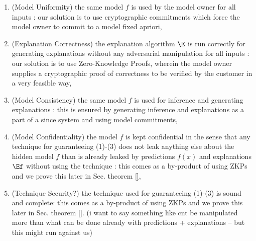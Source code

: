 \begin{enumerate}
    \item (Model Uniformity) the same model $f$ is used by the model owner for all inputs  : our solution is to use cryptographic commitments which force the model owner to commit to a model fixed apriori,
    \item (Explanation Correctness) the explanation algorithm $\E$ is run correctly for generating explanations without any adversarial manipulation for all inputs : our solution is to use Zero-Knowledge Proofs, wherein the model owner supplies a cryptographic proof of correctness to be verified by the customer in a very feasible way,
    \item (Model Consistency) the same model $f$ is used for inference and generating explanations : this is ensured by generating inference and explanations as a part of a since system and using model commitments,
    \item (Model Confidentiality) the model $f$ is kept confidential in the sense that any technique for guaranteeing (1)-(3) does not leak anything else about the hidden model $f$ than is already leaked by predictions $f(x)$ and explanations $\Ef$ without using the technique : this comes as a by-product of using ZKPs and we prove this later in Sec. theorem \ref{},
    \item (Technique Security?) the technique used for guaranteeing (1)-(3) is sound and complete: this comes as a by-product of using ZKPs and we prove this later in Sec. theorem \ref{}. (i want to say something like cnt be manipulated more than what can be done already with predictions + explanations -- but this might run against us)
\end{enumerate}